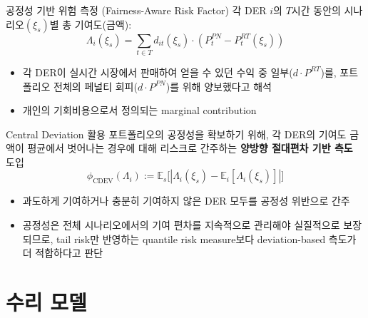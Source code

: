 \documentclass[xcolor=dvipsnames,t,9pt]{beamer}
\begin{document}
\begin{frame}{공정성 기반 위험 측정 (Fairness-Aware Risk Factor)}
    각 DER \(i\)의 $T$시간 동안의 시나리오$(\xi_s)$별 총 기여도(금액):
    \[
        \Lambda_{i}(\xi_s) = \sum_{t \in T} d_{it}(\xi_s) \cdot (P^{PN}_t - P^{RT}_{t}(\xi_s))
    \]
    \vspace{-1em}
    \begin{itemize}
        \item 각 DER이 실시간 시장에서 판매하여 얻을 수 있던 수익 중 일부($d \cdot P^{RT}$)를, 포트폴리오 전체의 페널티 회피($d \cdot P^{PN}$)를 위해 양보했다고 해석
        \item 개인의 기회비용으로서 정의되는 marginal contribution
    \end{itemize}
    \vspace{-0.5em}
    \begin{alertblock}{Central Deviation 활용}
        포트폴리오의 공정성을 확보하기 위해, 각 DER의 기여도 금액이 평균에서 벗어나는 경우에 대해 리스크로 간주하는 \textbf{양방향 절대편차 기반 측도} 도입
        \[
            \phi_{\text{CDEV}}(\Lambda_i) := \mathbb{E}_s \big[ \left| \Lambda_i(\xi_s) - \mathbb{E}_i[\Lambda_i(\xi_s)] \right| \big]
        \]
        \vspace{-1.5em}
        \begin{itemize}
            \item 과도하게 기여하거나 충분히 기여하지 않은 DER 모두를 공정성 위반으로 간주
            \item 공정성은 전체 시나리오에서의 기여 편차를 지속적으로 관리해야 실질적으로 보장되므로, tail risk만 반영하는 quantile risk measure보다 deviation-based 측도가 더 적합하다고 판단
        \end{itemize}
    \end{alertblock}

\end{frame}

\section[수리 모델]{수리 모델} %
\end{document}
